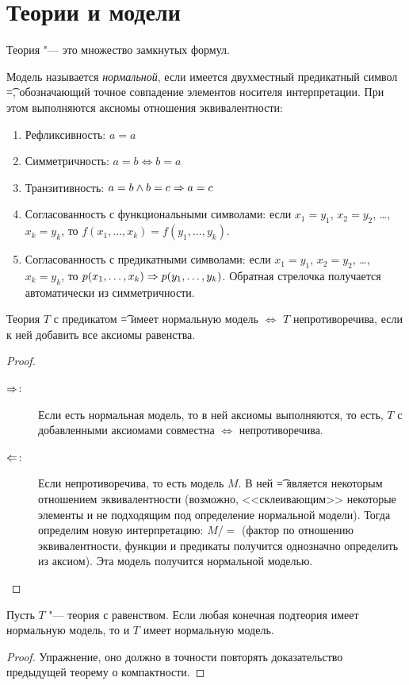 \section{Теории и модели}
\begin{Def}
	Теория "--- это множество замкнутых формул.
\end{Def}
\begin{Def}
	Модель называется \textsl{нормальной}, если имеется двухместный предикатный символ \t{=},
	обозначающий точное совпадение элементов носителя интерпретации.
	При этом выполняются аксиомы отношения эквивалентности:
	\begin{enumerate}
		\item Рефликсивность: $a=a$
		\item Симметричность: $a = b \iff b = a$
		\item Транзитивность: $a = b \land b = c \Rightarrow a = c$
		\item
			Согласованность с функциональными символами: если $x_1=y_1$, $x_2=y_2$, \dots, $x_k=y_k$,
			то $f(x_1, \dots, x_k) = f(y_1, \dots, y_k)$.
		\item
			Согласованность с предикатными символами: если $x_1=y_1$, $x_2=y_2$, \dots, $x_k=y_k$,
			то $p(x_1, \dots, x_k) \Rightarrow p(y_1, \dots, y_k)$.
			Обратная стрелочка получается автоматически из симметричности.
	\end{enumerate}
\end{Def}
\begin{theorem}
	Теория $T$ с предикатом \t{=} имеет нормальную модель $\iff$ $T$ непротиворечива, если
	к ней добавить все аксиомы равенства.
\end{theorem}
\begin{proof}
	\begin{description}
		\item[$\Rightarrow$:]
			Если есть нормальная модель, то в ней аксиомы выполняются, то есть, $T$ с добавленными аксиомами совместна $\iff$ непротиворечива.
		\item[$\Leftarrow$:]
			Если непротиворечива, то есть модель $M$.
			В ней \t{=} является некоторым отношением эквивалентности (возможно, <<склеивающим>> некоторые элементы и не подходящим под определение нормальной модели).
			Тогда определим новую интерпретацию: $M/=$ (фактор по отношению эквивалентности, функции и предикаты
			получится однозначно определить из аксиом).
			Эта модель получится нормальной моделью.
	\end{description}
\end{proof}
\begin{conseq}
	Пусть $T$ "--- теория с равенством.
	Если любая конечная подтеория имеет нормальную модель, то и $T$ имеет нормальную модель.
\end{conseq}
\begin{proof}
	Упражнение, оно должно в точности повторять доказательство предыдущей теорему о компактности.
\end{proof}


